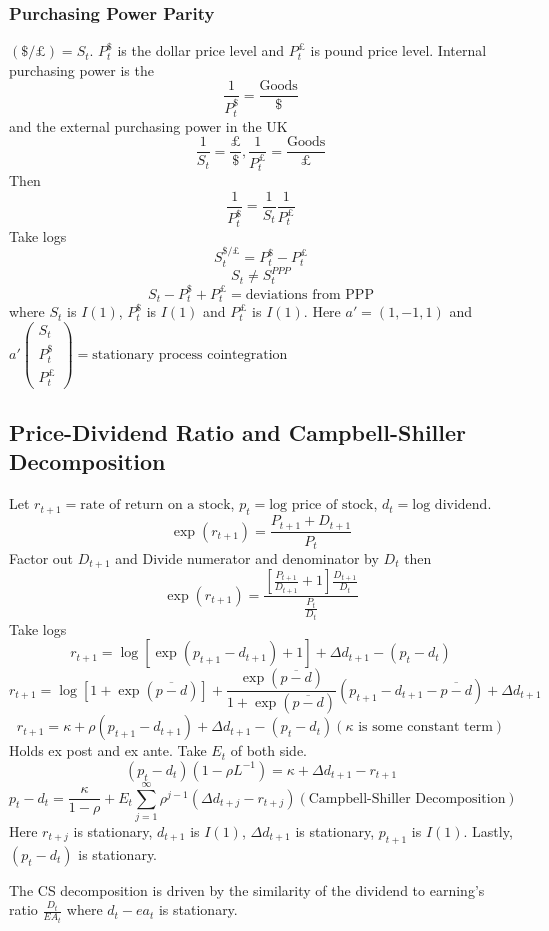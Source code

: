 \documentclass[11pt, a4paper, oneside]{article}
\theoremstyle{definition}
\theoremstyle{proposition}
\theoremstyle{corollary}
\theoremstyle{lemma}
\theoremstyle{theorem}
\begin{document}
\subsubsection{Purchasing Power Parity}
$(\$/\pounds) = S_t$. $P^{\$}_t$ is the dollar price level and $P_t^{\pounds}$ is pound price level. Internal purchasing power is the $$\frac{1}{P_t^{\$}} = \frac{\text{Goods}}{\$}$$ and the external purchasing power in the UK
$$\frac{1}{S_t} = \frac{\pounds}{\$}, \frac{1}{P_t^{\pounds}} = \frac{\text{Goods}}{\pounds}$$
Then $$\frac{1}{P_t^{\$}} = \frac{1}{S_t} \frac{1}{P_t^{\pounds}}$$
Take logs
$$S_t^{\$/\pounds} = P_t^{\$} - P_t^{\pounds}$$ 
$$S_t \neq S_t^{PPP}$$
$$S_t - P_t^{\$} + P_t^{\pounds} = \text{deviations from PPP}$$
where $S_t$ is $I(1)$, $P_t^{\$}$ is $I(1)$ and $P_t^{\pounds} $ is $I(1)$. Here $a' = (1, -1, 1)$ and $a'\begin{pmatrix}S_t\\ P_t^{\$} \\ P_t^{\pounds} \end{pmatrix} = \text{stationary process cointegration}$

\subsection{Price-Dividend Ratio and Campbell-Shiller Decomposition}
Let $r_{t+1} =\text{rate of return on a stock}$, $p_t = \text{log price of stock}$, $d_t = \text{log dividend}$. 
$$\exp(r_{t+1}) = \frac{P_{t+1} + D_{t+1}}{P_t}$$
Factor out $D_{t+1}$ and Divide numerator and denominator by $D_t$ then
$$\exp(r_{t+1}) = \frac{\left[\frac{P_{t+1}}{D_{t+1}} + 1\right] \frac{D_{t+1} }{D_t}}{\frac{P_t}{D_t}}$$ 
Take logs
$$r_{t+1} = \log [\exp(p_{t+1} - d_{t+1}) +1] + \Delta d_{t+1} - (p_t -d_t)$$
$$r_{t+1} = \log[ 1 + \exp(\overline{p-d})] + \frac{\exp(\overline{p-d})}{1 + \exp(\overline{p-d})}(p_{t+1} - d_{t +1} - \overline{p-d}) + \Delta d_{t+1} $$
$$r_{t+1} = \kappa + \rho(p_{t+1} - d_{t +1}) + \Delta d_{t+1} - (p_t- d_t) (\kappa \text{ is some constant term})$$
Holds ex post and ex ante. Take $E_t$ of both side. 
$$(p_t - d_t)(1- \rho L^{-1}) = \kappa + \Delta d_{t+1} - r_{t+1}$$
$$p_t - d_t = \frac{\kappa}{1- \rho} + E_t\sum_{j=1}^{\infty} \rho^{j-1}(\Delta d_{t+j} - r_{t+j}) (\text{Campbell-Shiller Decomposition})$$
Here $r_{t+j}$ is stationary, $d_{t+1}$ is $I(1)$, $\Delta d_{t+1}$ is stationary, $p_{t+1}$ is $I(1)$. Lastly, $(p_t - d_t)$ is stationary. 

The CS decomposition is driven by the similarity of the dividend to earning's ratio $\frac{D_t}{EA_t}$ where $d_t - ea_t$ is stationary. 
\end{document}
